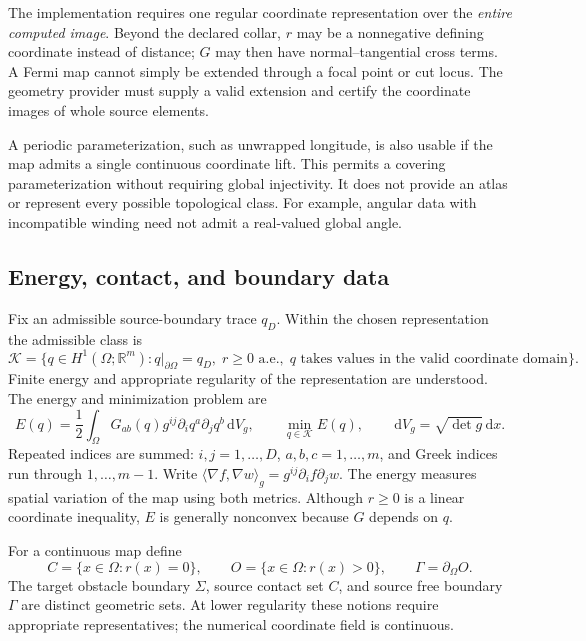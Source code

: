 \documentclass[11pt,a4paper]{article}
\newcommand{\R}{\mathbb R}
\newcommand{\dd}{\,\mathrm d}
\newcommand{\ip}[2]{\langle #1,#2\rangle_g}
\begin{document}
The implementation requires one regular coordinate representation over the
\emph{entire computed image}. Beyond the declared collar, \(r\) may be a
nonnegative defining coordinate instead of distance; \(G\) may then have
normal--tangential cross terms. A Fermi map cannot simply be extended through
a focal point or cut locus. The geometry provider must supply a valid extension
and certify the coordinate images of whole source elements.

A periodic parameterization, such as unwrapped longitude, is also usable if
the map admits a single continuous coordinate lift. This permits a covering
parameterization without requiring global injectivity. It does not provide
an atlas or represent every possible topological class. For example, angular
data with incompatible winding need not admit a real-valued global angle.

\subsection{Energy, contact, and boundary data}
Fix an admissible source-boundary trace \(q_D\). Within the chosen
representation the admissible class is
\begin{equation}
 \mathcal K=\{q\in H^1(\Omega;\R^m):q|_{\partial\Omega}=q_D,\;
 r\geq0\text{ a.e.},\;q\text{ takes values in the valid coordinate domain}\}.
 \label{eq:admissible}
\end{equation}
Finite energy and appropriate regularity of the representation are understood.
The energy and minimization problem are
\begin{equation}
 E(q)=\frac12\int_\Omega G_{ab}(q)g^{ij}\partial_iq^a\partial_jq^b\dd V_g,
 \qquad \min_{q\in\mathcal K}E(q),\qquad
 \dd V_g=\sqrt{\det g}\dd x.
 \label{eq:energy}
\end{equation}
Repeated indices are summed: \(i,j=1,\ldots,D\),
\(a,b,c=1,\ldots,m\), and Greek indices run through \(1,\ldots,m-1\).
Write \(\ip{\nabla f}{\nabla w}=g^{ij}\partial_i f\partial_j w\).
The energy measures spatial variation of the map using both metrics.
Although \(r\geq0\) is a linear coordinate inequality, \(E\) is generally
nonconvex because \(G\) depends on \(q\).

For a continuous map define
\begin{equation}
 C=\{x\in\Omega:r(x)=0\},\qquad
 O=\{x\in\Omega:r(x)>0\},\qquad
 \Gamma=\partial_\Omega O.
\end{equation}
The target obstacle boundary \(\Sigma\), source contact set \(C\), and
source free boundary \(\Gamma\) are distinct geometric sets. At lower
regularity these notions require appropriate representatives; the numerical
coordinate field is continuous.
\end{document}
